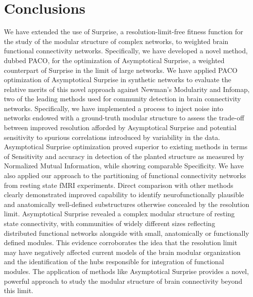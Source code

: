 \section{Conclusions}
We have extended the use of Surprise, a resolution-limit-free fitness function for the study of the modular structure of complex networks, to weighted brain functional connectivity networks. Specifically, we have developed a novel method, dubbed PACO, for the optimization of Asymptotical Surprise, a weighted counterpart of Surprise in the limit of large networks. We have applied PACO optimization of Asymptotical Surprise in synthetic networks to evaluate the relative merits of this novel approach against Newman's Modularity and Infomap, two of the leading methods used for community detection in brain connectivity networks. Specifically, we have implemented a process to inject noise into networks endowed with a ground-truth modular structure to assess the trade-off between improved resolution afforded by Asymptotical Surprise and potential sensitivity to spurious correlations introduced by variability in the data. Asymptotical Surprise optimization proved superior to existing methods in terms of Sensitivity and accuracy in detection of the planted structure as measured by Normalized Mutual Information, while showing comparable Specificity. We have also applied our approach to the partitioning of functional connectivity networks from resting state fMRI experiments. Direct comparison with other methods clearly demonstrated improved capability to identify neurofunctionally plausible and anatomically well-defined substructures otherwise concealed by the resolution limit. Asymptotical Surprise revealed a complex modular structure of resting state connectivity, with communities of widely different sizes reflecting distributed functional networks alongside with small, anatomically or functionally defined modules. This evidence corroborates the idea that the resolution limit may have negatively affected current models of the brain modular organization and the identification of the hubs responsible for integration of functional modules. 
The application of methods like Asymptotical Surprise provides a novel, powerful approach to study the modular structure of brain connectivity beyond this limit.
